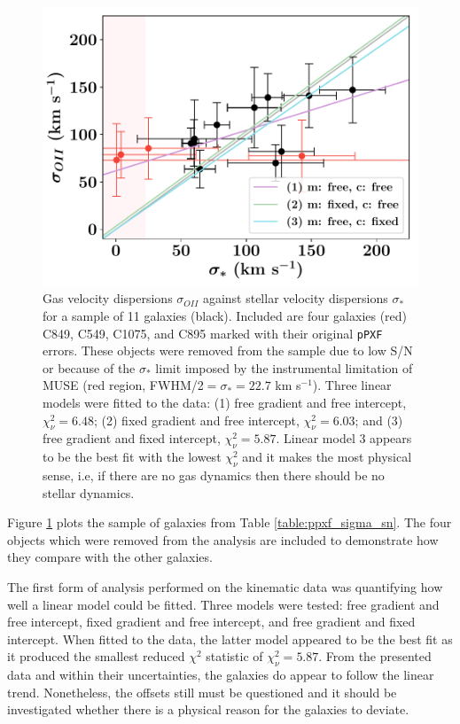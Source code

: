 \documentclass[12pt, twocolumn, nofootinbib]{revtex4-1}    %
\begin{document}
\begin{figure}
\includegraphics[width=1.0\linewidth]{data/sigma_star_vs_sigma_oii}
\caption{Gas velocity dispersions $\sigma_{OII}$ against stellar velocity dispersions $\sigma_*$ for a sample of 11 galaxies (black). Included are four galaxies (red) C849, C549, C1075, and C895 marked with their original \texttt{pPXF} errors. These objects were removed from the sample due to low S/N or because of the $\sigma_*$ limit imposed by the instrumental limitation of MUSE (red region, FWHM/2$=\sigma_*=22.7$ km s$^{-1}$). Three linear models were fitted to the data: (1) free gradient and free intercept, $\chi^2_{\nu}=6.48$; (2) fixed gradient and free intercept, $\chi^2_\nu=6.03$; and (3) free gradient and fixed intercept, $\chi^2_\nu=5.87$. Linear model 3 appears to be the best fit with the lowest $\chi^2_\nu$ and it makes the most physical sense, i.e, if there are no gas dynamics then there should be no stellar dynamics.}
\label{fig:velocity_dispersions}
\end{figure}

Figure \ref{fig:velocity_dispersions} plots the sample of galaxies from Table \ref{table:ppxf_sigma_sn}. The four objects which were removed from the analysis are included to demonstrate how they compare with the other galaxies. 

The first form of analysis performed on the kinematic data was quantifying how well a linear model could be fitted. Three models were tested: free gradient and free intercept, fixed gradient and free intercept, and free gradient and fixed intercept. When fitted to the data, the latter model appeared to be the best fit as it produced the smallest reduced $\chi^2$ statistic of $\chi^2_\nu=5.87$. From the presented data and within their uncertainties, the galaxies do appear to follow the linear trend. Nonetheless, the offsets still must be questioned and it should be investigated whether there is a physical reason for the galaxies to deviate. 
\end{document}
